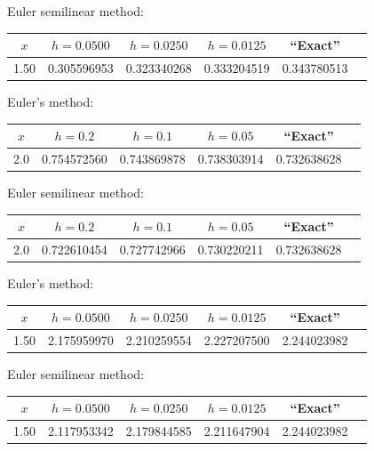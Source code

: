 \hspace{.75in}
{\small Euler semilinear method:
\begin{tabular}{|c|r|r|r|r|r|}
\hline
\multicolumn{1}{|c|}{$x$}&
\multicolumn{1}{|c|}{$h=0.0500$}&
\multicolumn{1}{|c|}{$h=0.0250$}&
\multicolumn{1}{|c|}{$h=0.0125$}&
\multicolumn{1}{|c|}{``Exact''}\\ \hline
1.50 & 0.305596953 & 0.323340268 & 0.333204519 & 0.343780513 \\
\hline
\end{tabular}}

\bigskip

{\small Euler's method:
\begin{tabular}{|c|r|r|r|r|r|}
\hline
\multicolumn{1}{|c|}{$x$}&
\multicolumn{1}{|c|}{$h=0.2$}&
\multicolumn{1}{|c|}{$h=0.1$}&
\multicolumn{1}{|c|}{$h=0.05$}&
\multicolumn{1}{|c|}{``Exact''}\\ \hline
2.0 & 0.754572560 & 0.743869878 & 0.738303914 & 0.732638628 \\
\hline
\end{tabular}}

\bigskip

\hspace{.75in}
{\small Euler semilinear method:
\begin{tabular}{|c|r|r|r|r|r|}
\hline
\multicolumn{1}{|c|}{$x$}&
\multicolumn{1}{|c|}{$h=0.2$}&
\multicolumn{1}{|c|}{$h=0.1$}&
\multicolumn{1}{|c|}{$h=0.05$}&
\multicolumn{1}{|c|}{``Exact''}\\ \hline
2.0 & 0.722610454 & 0.727742966 & 0.730220211 & 0.732638628 \\
\hline
\end{tabular}}

\bigskip
{}
{\small Euler's method:
\begin{tabular}{|c|r|r|r|r|r|}
\hline
\multicolumn{1}{|c|}{$x$}&
\multicolumn{1}{|c|}{$h=0.0500$}&
\multicolumn{1}{|c|}{$h=0.0250$}&
\multicolumn{1}{|c|}{$h=0.0125$}&
\multicolumn{1}{|c|}{``Exact''}\\ \hline
1.50 & 2.175959970 & 2.210259554 & 2.227207500 & 2.244023982 \\
\hline
\end{tabular}}

\bigskip

\hspace{.75in}
{\small Euler semilinear method:
\begin{tabular}{|c|r|r|r|r|r|}
\hline
\multicolumn{1}{|c|}{$x$}&
\multicolumn{1}{|c|}{$h=0.0500$}&
\multicolumn{1}{|c|}{$h=0.0250$}&
\multicolumn{1}{|c|}{$h=0.0125$}&
\multicolumn{1}{|c|}{``Exact''}\\ \hline
1.50 & 2.117953342 & 2.179844585 & 2.211647904 & 2.244023982 \\
\hline
\end{tabular}}

